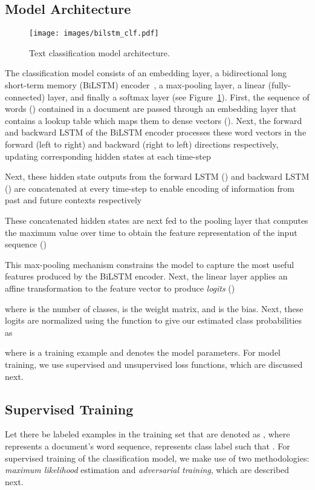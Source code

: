 \documentclass[letterpaper]{article}
\newcommand{\citep}{\cite}
\begin{document}
\subsection{Model Architecture}
\begin{figure}[t]
\centering
\texttt{[image: images/bilstm\_clf.pdf]}
\caption{Text classification model architecture.}
\label{fig:model}
\end{figure}

The classification model consists of an embedding layer, a bidirectional long short-term memory (BiLSTM) encoder~\citep{hochreiter1997long,schuster1997bidirectional}, a max-pooling layer, a linear (fully-connected) layer, and finally a softmax layer (see Figure~\ref{fig:model}). 
First, the sequence of words () contained in a document are passed through an embedding layer that contains a lookup table which maps them to dense vectors 
(). 
Next, the forward and backward LSTM of the BiLSTM encoder processes these word vectors in the forward (left to right) and backward (right to left) directions respectively, updating corresponding hidden states at each time-step

Next, these hidden state outputs from the forward LSTM () and backward LSTM () are concatenated at every time-step to enable encoding of information from past and future contexts respectively

These concatenated hidden states are next fed to the pooling layer that computes the maximum value over time to obtain the feature representation of the input sequence () 

This max-pooling mechanism constrains the model to
capture the most useful features produced by the BiLSTM encoder. Next, the linear layer applies an affine transformation to the feature vector to produce \emph{logits} ()

where  is the number of classes,  is the weight matrix, and  is the bias. Next, these logits are normalized using the  function to give our estimated class probabilities as

where  is a training example and  denotes the model parameters.
For model training, we use supervised and unsupervised loss functions, which are discussed next.

\subsection{Supervised Training}
Let there be  labeled examples in the training set that are denoted as , where  represents a document's word sequence,  represents class label such that . For supervised training of the classification model, we make use of two methodologies: \emph{maximum likelihood} estimation and \emph{adversarial training}, which are described next.
\end{document}
